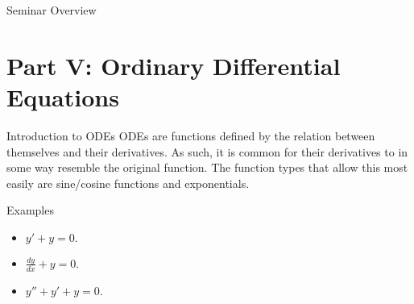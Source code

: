 



\begin{frame}[label=toc]{Seminar Overview}
    \tableofcontents
\end{frame}

\section[Part V: ODEs]{Part V: Ordinary Differential Equations}
\begin{frame}{Introduction to ODEs}
    ODEs are functions defined by the relation between themselves and their derivatives. \pause
    As such, it is common for their derivatives to in some way resemble the original function. \pause
    The function types that allow this most easily are sine/cosine functions and exponentials. \pause
    
    \begin{exampleblock}{Examples}
        \begin{itemize}
            \item \(y' + y = 0.\) \pause
            \item \(\displaystyle \frac{dy}{dx} + y = 0\). \pause
            \item \(\displaystyle y'' + y' + y = 0\).
        \end{itemize}
    \end{exampleblock}
\end{frame}

